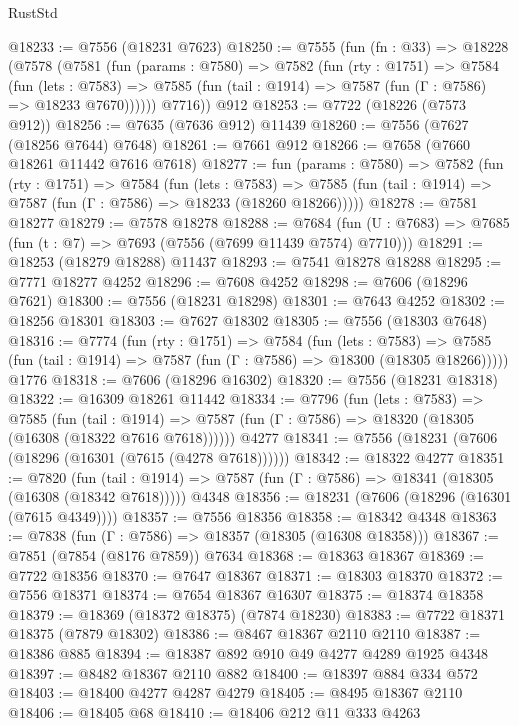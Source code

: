 \begin{lexlean}{RustStd}
\begin{coremodule}
{\begin{coremodule}
{{{{{{{{{{{{{{{{{{{{{{{{{{{{{{{{{{{{{{{{{{{@18233 := @7556 (@18231 @7623)
@18250 := @7555
    (fun (fn : @33) =>
    @18228
      (@7578
        (@7581
          (fun (params : @7580) =>
          @7582
            (fun (rty : @1751) =>
            @7584
              (fun (lets : @7583) =>
              @7585 (fun (tail : @1914) => @7587 (fun (Γ : @7586) => @18233 @7670))))))
        @7716))
    @912
@18253 := @7722 (@18226 (@7573 @912))
@18256 := @7635 (@7636 @912) @11439
@18260 := @7556 (@7627 (@18256 @7644) @7648)
@18261 := @7661 @912
@18266 := @7658 (@7660 @18261 @11442 @7616 @7618)
@18277 := fun (params : @7580) =>
  @7582
    (fun (rty : @1751) =>
    @7584
      (fun (lets : @7583) =>
      @7585 (fun (tail : @1914) => @7587 (fun (Γ : @7586) => @18233 (@18260 @18266)))))
@18278 := @7581 @18277
@18279 := @7578 @18278
@18288 := @7684
    (fun (U : @7683) => @7685 (fun (t : @7) => @7693 (@7556 (@7699 @11439 @7574) @7710)))
@18291 := @18253 (@18279 @18288) @11437
@18293 := @7541 @18278 @18288
@18295 := @7771 @18277 @4252
@18296 := @7608 @4252
@18298 := @7606 (@18296 @7621)
@18300 := @7556 (@18231 @18298)
@18301 := @7643 @4252
@18302 := @18256 @18301
@18303 := @7627 @18302
@18305 := @7556 (@18303 @7648)
@18316 := @7774
    (fun (rty : @1751) =>
    @7584
      (fun (lets : @7583) =>
      @7585 (fun (tail : @1914) => @7587 (fun (Γ : @7586) => @18300 (@18305 @18266)))))
    @1776
@18318 := @7606 (@18296 @16302)
@18320 := @7556 (@18231 @18318)
@18322 := @16309 @18261 @11442
@18334 := @7796
    (fun (lets : @7583) =>
    @7585
      (fun (tail : @1914) =>
      @7587 (fun (Γ : @7586) => @18320 (@18305 (@16308 (@18322 @7616 @7618))))))
    @4277
@18341 := @7556 (@18231 (@7606 (@18296 (@16301 (@7615 (@4278 @7618))))))
@18342 := @18322 @4277
@18351 := @7820
    (fun (tail : @1914) => @7587 (fun (Γ : @7586) => @18341 (@18305 (@16308 (@18342 @7618)))))
    @4348
@18356 := @18231 (@7606 (@18296 (@16301 (@7615 @4349))))
@18357 := @7556 @18356
@18358 := @18342 @4348
@18363 := @7838 (fun (Γ : @7586) => @18357 (@18305 (@16308 @18358)))
@18367 := @7851 (@7854 (@8176 @7859)) @7634
@18368 := @18363 @18367
@18369 := @7722 @18356
@18370 := @7647 @18367
@18371 := @18303 @18370
@18372 := @7556 @18371
@18374 := @7654 @18367 @16307
@18375 := @18374 @18358
@18379 := @18369 (@18372 @18375) (@7874 @18230)
@18383 := @7722 @18371 @18375 (@7879 @18302)
@18386 := @8467 @18367 @2110 @2110
@18387 := @18386 @885
@18394 := @18387 @892 @910 @49 @4277 @4289 @1925 @4348
@18397 := @8482 @18367 @2110 @882
@18400 := @18397 @884 @334 @572
@18403 := @18400 @4277 @4287 @4279
@18405 := @8495 @18367 @2110
@18406 := @18405 @68
@18410 := @18406 @212 @11 @333 @4263
}}}}}}}}}}}}}}}}}}}}}}}}}}}}}}}}}}}}}}}}}}}
\end{coremodule}}
\end{coremodule}
\end{lexlean}
